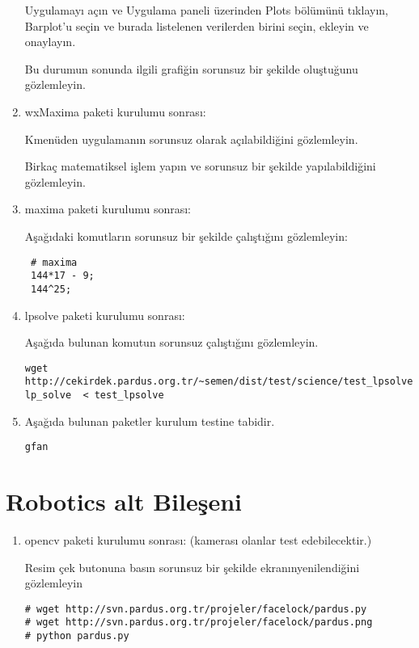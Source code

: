 \documentclass[a4paper,10pt]{article}
\begin{document}
\begin{enumerate}
Uygulamayı açın ve Uygulama paneli üzerinden Plots bölümünü tıklayın, Barplot'u seçin ve burada listelenen verilerden birini seçin, ekleyin ve onaylayın. 

Bu durumun sonunda ilgili grafiğin sorunsuz bir şekilde oluştuğunu gözlemleyin.

\item wxMaxima paketi kurulumu sonrası:

Kmenüden uygulamanın sorunsuz olarak açılabildiğini gözlemleyin.

Birkaç matematiksel işlem yapın ve sorunsuz bir şekilde yapılabildiğini gözlemleyin.
\item maxima paketi kurulumu sonrası:

Aşağıdaki komutların sorunsuz bir şekilde çalıştığını gözlemleyin:
\begin{verbatim}
 # maxima
 144*17 - 9;
 144^25;
\end{verbatim}
\item lpsolve paketi kurulumu sonrası:

Aşağıda bulunan komutun sorunsuz çalıştığını gözlemleyin.

\begin{verbatim}
wget http://cekirdek.pardus.org.tr/~semen/dist/test/science/test_lpsolve
lp_solve  < test_lpsolve
\end{verbatim}


\item Aşağıda bulunan paketler kurulum testine tabidir.
\begin{verbatim}
gfan 
\end{verbatim}

\end{enumerate}

\section{Robotics alt Bileşeni}
\begin{enumerate}
 \item opencv paketi kurulumu sonrası: (kamerası olanlar test edebilecektir.)

Resim çek butonuna basın sorunsuz bir şekilde ekranınyenilendiğini gözlemleyin
\begin{verbatim}
# wget http://svn.pardus.org.tr/projeler/facelock/pardus.py
# wget http://svn.pardus.org.tr/projeler/facelock/pardus.png
# python pardus.py
\end{verbatim}


\end{enumerate}
\end{document}
